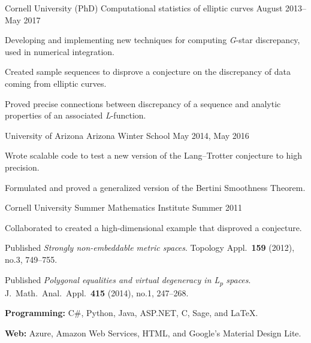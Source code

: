 \documentclass[11pt, letterpaper]{awesome-cv}
\begin{document}

\begin{cventries}

\cventry
	{Cornell University (PhD)}
	{Computational statistics of elliptic curves}
	{}
	{August 2013--May 2017}
	{
		\begin{cvitems}
			\item{Developing and implementing new techniques for computing \emph{G}-star discrepancy, used in numerical integration.}
			\item{Created sample sequences to disprove a conjecture on the discrepancy of data coming from elliptic curves.}
			\item{Proved precise connections between discrepancy of a sequence and analytic properties of an associated \emph{L}-function.}
		\end{cvitems}
	}
		
\cventry
	{University of Arizona}
	{Arizona Winter School}
	{}
	{May 2014, May 2016}
	{
		\begin{cvitems}
			\item{Wrote scalable code to test a new version of the Lang--Trotter conjecture to high precision.}
			\item{Formulated and proved a generalized version of the Bertini Smoothness Theorem.}
		\end{cvitems}
	}
	
\cventry
	{Cornell University}
	{Summer Mathematics Institute}
	{}
	{Summer 2011}
	{
		\begin{cvitems}
			\item{Collaborated to created a high-dimensional example that disproved a conjecture.}
			\item{Published \emph{Strongly non-embeddable metric spaces}. Topology Appl.~\textbf{159} (2012), no.3, 749--755.}
			\item{Published \emph{Polygonal equalities and virtual degeneracy in L\textsubscript{p} spaces}. J.~Math.~Anal.~Appl.~\textbf{415} (2014), no.1, 247--268.}
		\end{cvitems}
	}
\end{cventries}






\begin{cvparagraph}
\textbf{Programming:} C\#, Python, Java, ASP.NET, C, Sage, and \LaTeX.

\textbf{Web:} Azure, Amazon Web Services, HTML, and Google's Material Design Lite.
\end{cvparagraph}
\end{document}
